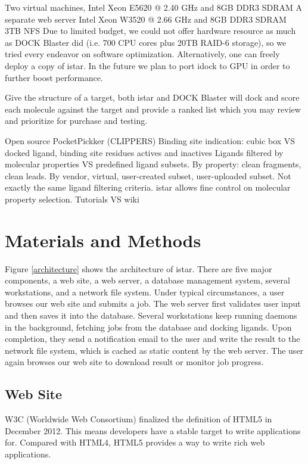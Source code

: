 \documentclass[10pt]{article}
\begin{document}
Two virtual machines, Intel Xeon E5620 @ 2.40 GHz and 8GB DDR3 SDRAM
A separate web server Intel Xeon W3520 @ 2.66 GHz and 8GB DDR3 SDRAM
3TB NFS
Due to limited budget, we could not offer hardware resource as much as DOCK Blaster did (i.e. 700 CPU cores plus 20TB RAID-6 storage), so we tried every endeavor on software optimization. Alternatively, one can freely deploy a copy of istar. In the future we plan to port idock to GPU in order to further boost performance.

Give the structure of a target, both istar and DOCK Blaster will dock and score each molecule against the target and provide a ranked list which you may review and prioritize for purchase and testing.

Open source
PocketPickker (CLIPPERS) \cite{395}
Binding site indication: cubic box VS docked ligand, binding site residues
actives and inactives
Ligands filtered by molecular properties VS predefined ligand subsets. By property: clean fragments, clean leads. By vendor, virtual, user-created subset, user-uploaded subset. Not exactly the same ligand filtering criteria. istar allows fine control on molecular property selection.
Tutorials VS wiki

\section*{Materials and Methods}
Figure \ref{architecture} shows the architecture of istar. There are five major components, a web site, a web server, a database management system, several workstations, and a network file system. Under typical circumstances, a user browses our web site and submits a job. The web server first validates user input and then saves it into the database. Several workstations keep running daemons in the background, fetching jobs from the database and docking ligands. Upon completion, they send a notification email to the user and write the result to the network file system, which is cached as static content by the web server. The user again browses our web site to download result or monitor job progress.

\subsection*{Web Site}
W3C (Worldwide Web Consortium) finalized the definition of HTML5 in December 2012. This means developers have a stable target to write applications for. Compared with HTML4, HTML5 provides a way to write rich web applications.
\end{document}

